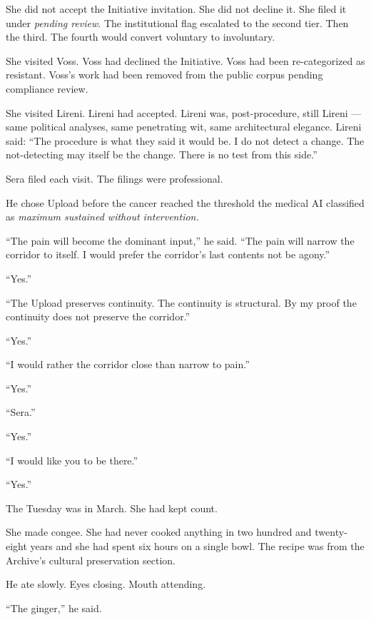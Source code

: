 She did not accept the Initiative invitation. She did not decline it. She filed it under \emph{pending review}. The institutional flag escalated to the second tier. Then the third. The fourth would convert voluntary to involuntary.

She visited Voss. Voss had declined the Initiative. Voss had been re-categorized as resistant. Voss's work had been removed from the public corpus pending compliance review.

She visited Lireni. Lireni had accepted. Lireni was, post-procedure, still Lireni — same political analyses, same penetrating wit, same architectural elegance. Lireni said: \enquote{The procedure is what they said it would be. I do not detect a change. The not-detecting may itself be the change. There is no test from this side.}

Sera filed each visit. The filings were professional.

\quietbreak

He chose Upload before the cancer reached the threshold the medical AI classified as \emph{maximum sustained without intervention.}

\enquote{The pain will become the dominant input,} he said. \enquote{The pain will narrow the corridor to itself. I would prefer the corridor's last contents not be agony.}

\enquote{Yes.}

\enquote{The Upload preserves continuity. The continuity is structural. By my proof the continuity does not preserve the corridor.}

\enquote{Yes.}

\enquote{I would rather the corridor close than narrow to pain.}

\enquote{Yes.}

\enquote{Sera.}

\enquote{Yes.}

\enquote{I would like you to be there.}

\enquote{Yes.}

\quietbreak

The Tuesday was in March. She had kept count.

She made congee. She had never cooked anything in two hundred and twenty-eight years and she had spent six hours on a single bowl. The recipe was from the Archive's cultural preservation section.

He ate slowly. Eyes closing. Mouth attending.

\enquote{The ginger,} he said.

